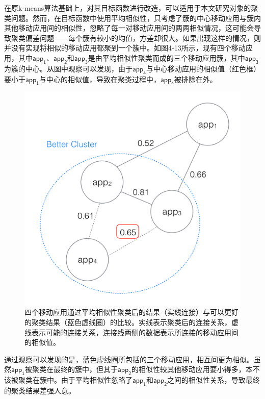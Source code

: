 在原k-means算法基础上，对其目标函数进行改造，可以适用于本文研究对象的聚类问题。然而，在目标函数中使用平均相似性，只考虑了簇的中心移动应用与簇内其他移动应用间的相似性，忽略了每一对移动应用间的两两相似情况，这可能会导致聚类偏差问题——每个簇有较小的均值，方差却很大。如果出现这样的情况，则并没有实现将相似的移动应用都聚到一个簇中。如图4-13所示，现有四个移动应用，其中$\mathsf{app_1}$、$\mathsf{app_2}$和$\mathsf{app_3}$是由平均相似性聚类而成的三个移动应用簇，其中$\mathsf{app_3}$为簇的中心。从图中观察可以发现，由于$\mathsf{app_4}$与中心移动应用的相似值（红色框）要小于$\mathsf{app_1}$与中心的相似值，导致在聚类过程中，$\mathsf{app_4}$被排除在外。
\begin{figure}
	\centering
	\includegraphics[width=4.8in]{figures/clustering}
	\caption{四个移动应用通过平均相似性聚类后的结果（实线连接）与可以更好的聚类结果（蓝色虚线圈）的比较。实线表示聚类后的连接关系，虚线表示可能的连接关系，连接线两侧的数据表示所连接的移动应用间的相似值。}
\end{figure}
通过观察可以发现的是，蓝色虚线圈所包括的三个移动应用，相互间更为相似。虽然$\mathsf{app_1}$被聚类在最终的簇中，但其于$\mathsf{app_2}$的相似性较其他移动应用要小得多，本不该被聚类在簇中。由于平均相似性忽略了$\mathsf{app_1}$和$\mathsf{app_2}$之间的相似性关系，导致最终的聚类结果差强人意。

